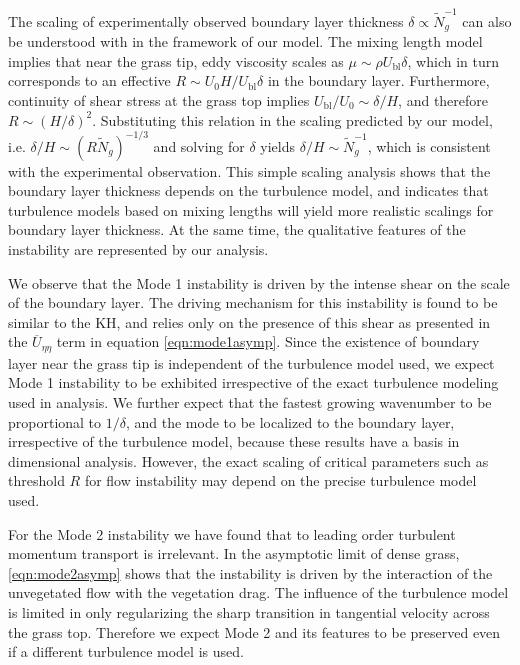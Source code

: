 \documentclass[12pt]{report}   %
\newcommand{\Rey}{{R}}
\newcommand{\Ndg}{\tilde{N}_g}
\newcommand{\ubl}{U_\text{bl}}
\renewcommand{\bar}{\overline}
\begin{document}
The scaling of experimentally observed boundary layer thickness $\delta \propto \Ndg^{-1}$ can also be understood with in the framework of our model. 
The mixing length model implies that near the grass tip, eddy viscosity scales as $\mu \sim \rho \ubl \delta$, which in turn corresponds to an effective $\Rey \sim U_0H/\ubl \delta$ in the boundary layer. Furthermore, continuity of shear stress at the grass top implies $\ubl/U_0 \sim \delta/H$, and therefore $\Rey \sim (H/\delta)^2$. Substituting this relation in the scaling predicted by our model, i.e. $\delta/H \sim (\Rey \Ndg)^{-1/3}$ and solving for $\delta$ yields $\delta/H \sim \Ndg^{-1}$, which is consistent with the experimental observation. This simple scaling analysis shows that the boundary layer thickness depends on the turbulence model, and indicates that turbulence models based on mixing lengths will yield more realistic scalings for boundary layer thickness. At the same time, the qualitative features of the instability are represented by our analysis.

We observe that the Mode 1 instability is driven by the intense shear on the scale of the boundary layer.
The driving mechanism for this instability is found to be similar to the KH, and relies only on the presence of this shear as presented in the $\bar{U}_{\eta\eta}$ term in equation \eqref{eqn:mode1asymp}. Since the existence of boundary layer near the grass tip is independent of the turbulence model used, we expect Mode 1 instability to be exhibited irrespective of the exact turbulence modeling used in analysis. We further expect that the fastest growing wavenumber to be proportional to $1/\delta$, and the mode to be localized to the boundary layer, irrespective of the turbulence model, because these results have a basis in dimensional analysis. However, the exact scaling of critical parameters such as threshold $\Rey$ for flow instability may depend on the precise turbulence model used.

 
For the Mode 2 instability we have found that to leading order turbulent momentum transport is irrelevant.
In the asymptotic limit of dense grass, \eqref{eqn:mode2asymp} shows that the instability is driven by the interaction of the unvegetated flow with the vegetation drag. The influence of the turbulence model is limited in only regularizing the sharp transition in tangential velocity across the grass top.
Therefore we expect Mode 2 and its features to be preserved even if a different turbulence model is used.
\end{document}
